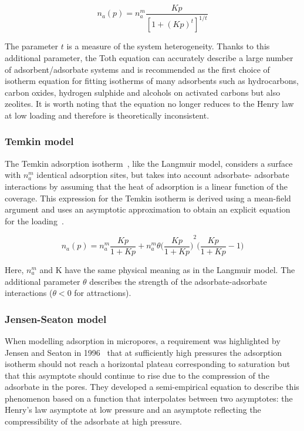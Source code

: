 \begin{equation}\label{eqn:pyg:toth}
    n_a(p) = n_a^m \frac{K p}{{[1 + {(K p)}^t]}^{1/t}}
\end{equation}

The parameter \(t\) is a measure of the system heterogeneity. Thanks to this
additional parameter, the Toth equation can accurately describe a
large number of adsorbent/adsorbate systems and is recommended as the first
choice of isotherm equation for fitting isotherms of many adsorbents such as
hydrocarbons, carbon oxides, hydrogen sulphide and alcohols on activated carbons
but also zeolites.
It is worth noting that the equation no longer reduces to the Henry law 
at low loading and therefore is theoretically inconsistent.


\subsubsection{Temkin model}

The Temkin adsorption isotherm~\cite{temkinKineticsAmmoniaSynthesis1940}, 
like the Langmuir model, considers
a surface with \(n_a^m\) identical adsorption sites, but takes into account adsorbate-
adsorbate interactions by assuming that the heat of adsorption is a linear
function of the coverage. This expression for the Temkin isotherm is derived
using a mean-field argument and uses an asymptotic approximation
to obtain an explicit equation for the 
loading~\cite{simonOptimizingNanoporousMaterials2014}.

\begin{equation}\label{eqn:pyg:temkin}
    n_a(p) = n_a^m \frac{Kp}{1+Kp} + n_a^m \theta 
    {\Big(\frac{Kp}{1+Kp}\Big)}^2 \Big(\frac{Kp}{1+Kp} -1\Big)
\end{equation}

Here, \(n_a^m\) and K have the same physical meaning as in the Langmuir model.
The additional parameter \(\theta\) describes the strength of the adsorbate-adsorbate
interactions (\(\theta < 0\) for attractions).

\subsubsection{Jensen-Seaton model}

When modelling adsorption in micropores, a requirement was highlighted by
Jensen and Seaton in 1996~\cite{jensenIsothermEquationAdsorption1996} 
that at sufficiently high pressures the adsorption
isotherm should not reach a horizontal plateau corresponding to saturation but
that this asymptote should continue to rise due to the compression 
of the adsorbate in the pores. They developed a semi-empirical equation
to describe this phenomenon based on a function that interpolates between
two asymptotes: the Henry’s law asymptote at low pressure and an
asymptote reflecting the compressibility of the adsorbate at
high pressure.

